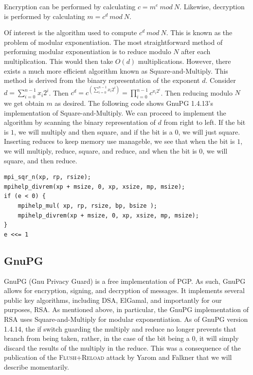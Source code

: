 \documentclass[11pt]{llncs}
\newcommand{\flushreload}{\textsc{Flush}+\textsc{Reload}}
\begin{document}
Encryption can be performed by calculating $c = m^e\ mod\ N$. Likewise,
decryption is performed by calculating $m = c^d\ mod\ N$.

Of interest is the algorithm used to compute $c^d\ mod\ N$. This is known as the
problem of modular exponentiation. The most straightforward method of performing
modular exponentiation is to reduce modulo $N$ after each multiplication. This
would then take $O(d)$ multiplications. However, there exists a much more
efficient algorithm known as Square-and-Multiply\cite{Knuth:1997:ACP:270146}.
This method is derived from the binary representation of the exponent $d$.
Consider $d = \sum_{i=0}^{n-1}x_i 2^i$. Then $c^d = c^{(\sum_{i=0}^{n-1}x_i
2^i)} = \prod_{i=0}^{n-1}c^{x_i 2^i}$. Then reducing modulo $N$ we get obtain
$m$ as desired. The following code shows GnuPG 1.4.13's implementation of
Square-and-Multiply. We can proceed to implement the algorithm by scanning the
binary representation of $d$ from right to left. If the bit is $1$, we will
multiply and then square, and if the bit is a $0$, we will just square.
Inserting reduces to keep memory use manageble, we see that when the bit is $1$,
we will multiply, reduce, square, and reduce, and when the bit is $0$, we will
square, and then reduce.

\begin{lstlisting}[caption={GnuPG 1.4.13's implementation of Square-and-Multiply
    (excerpted)}]
mpi_sqr_n(xp, rp, rsize);
mpihelp_divrem(xp + msize, 0, xp, xsize, mp, msize);
if (e < 0) {
    mpihelp_mul( xp, rp, rsize, bp, bsize );
    mpihelp_divrem(xp + msize, 0, xp, xsize, mp, msize);
}
e <<= 1
\end{lstlisting}

\subsection{GnuPG}

GnuPG (Gnu Privacy Guard) is a free implementation of PGP. As such, GnuPG allows
for encryption, signing, and decryption of messages. It implements several
public key algorithms, including DSA, ElGamal, and importantly for our purposes,
RSA. As mentioned above, in particular, the GnuPG implementation of RSA uses
Square-and-Multiply for modular exponentiation. As of GnuPG version 1.4.14, the
if switch guarding the multiply and reduce no longer prevents that branch from
being taken, rather, in the case of the bit being a $0$, it will simply discard
the results of the multiply in the reduce. This was a consequence of the
publication of the \flushreload{} attack by Yarom and Falkner\cite{YF13} that we
will describe momentarily.
\end{document}
